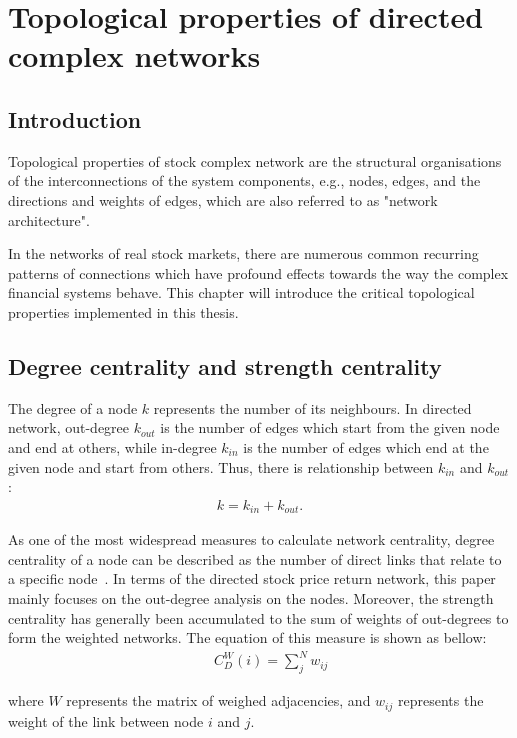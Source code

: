 \chapter[Network Topological properties]{Topological properties of directed complex networks}
\section{Introduction}
Topological properties of stock complex network are the structural organisations of the interconnections of the system components, e.g., nodes, edges, and the directions and weights of edges, which are also referred to as "network architecture".

In the networks of real stock markets, there are numerous common recurring patterns of connections which have profound effects towards the way the complex financial systems behave. This chapter will introduce the critical topological properties implemented in this thesis.

\section{Degree centrality and strength centrality}
The degree of a node $k$ represents the number of its neighbours. In directed network, out-degree $k_{out}$ is the number of edges which start from the given node and end at others, while in-degree $k_{in}$ is the number of edges which end at the given node and start from others. Thus, there is relationship between $k_{in}$ and $k_{out}$:
\begin{eqnarray}
k=k_{in}+k_{out}.
\end{eqnarray}

As one of the most widespread measures to calculate network centrality, degree centrality of a node can be described as the number of direct links that relate to a specific node~\cite{freeman}. In terms of the directed stock price return network, this paper mainly focuses on the out-degree analysis on the nodes. Moreover, the strength centrality has generally been accumulated to the sum of weights of out-degrees to form the weighted networks. The equation of this measure is shown as bellow:
\begin{eqnarray}
&&C_D^W(i)=\sum_{j}^{N}w_{ij}
\end{eqnarray}

where $W$ represents the matrix of weighed adjacencies, and $w_{ij}$ represents the weight of the link between node $i$ and $j$.

